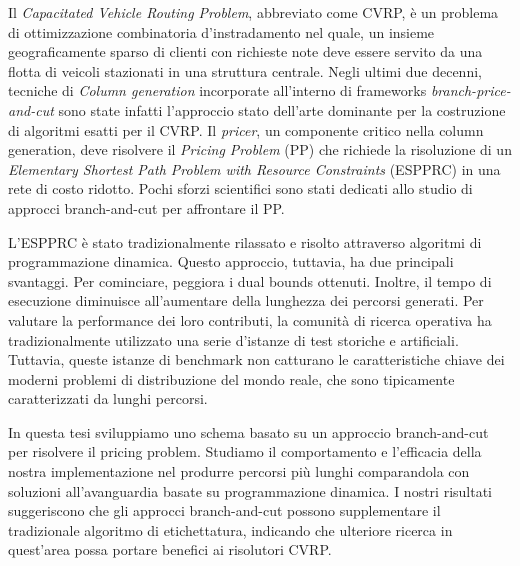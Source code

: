 {
\setlength\parindent{0pt}

Il \textit{Capacitated Vehicle Routing Problem}, abbreviato come CVRP, è un problema di ottimizzazione combinatoria d'instradamento nel quale, un insieme geograficamente sparso di clienti con richieste note deve essere servito da una flotta di veicoli stazionati in una struttura centrale.
Negli ultimi due decenni, tecniche di \textit{Column generation} incorporate all'interno di frameworks \textit{branch-price-and-cut} sono state infatti l'approccio stato dell'arte dominante per la costruzione di algoritmi esatti per il CVRP.
Il \textit{pricer}, un componente critico nella column generation, deve risolvere il \textit{Pricing Problem} (PP) che richiede la risoluzione di un \textit{Elementary Shortest Path Problem with Resource Constraints} (ESPPRC) in una rete di costo ridotto.
Pochi sforzi scientifici sono stati dedicati allo studio di approcci branch-and-cut per affrontare il PP.

L'ESPPRC è stato tradizionalmente rilassato e risolto attraverso algoritmi di programmazione dinamica.
Questo approccio, tuttavia, ha due principali svantaggi.
Per cominciare, peggiora i dual bounds ottenuti.
Inoltre, il tempo di esecuzione diminuisce all'aumentare della lunghezza dei percorsi generati.
Per valutare la performance dei loro contributi, la comunità di ricerca operativa ha tradizionalmente utilizzato una serie d'istanze di test storiche e artificiali.
Tuttavia, queste istanze di benchmark non catturano le caratteristiche chiave dei moderni problemi di distribuzione del mondo reale, che sono tipicamente caratterizzati da lunghi percorsi.

In questa tesi sviluppiamo uno schema basato su un approccio branch-and-cut per risolvere il pricing problem.
Studiamo il comportamento e l'efficacia della nostra implementazione nel produrre percorsi più lunghi comparandola con soluzioni all'avanguardia basate su programmazione dinamica.
I nostri risultati suggeriscono che gli approcci branch-and-cut possono supplementare il tradizionale algoritmo di etichettatura, indicando che ulteriore ricerca in quest'area possa portare benefici ai risolutori CVRP.
}
